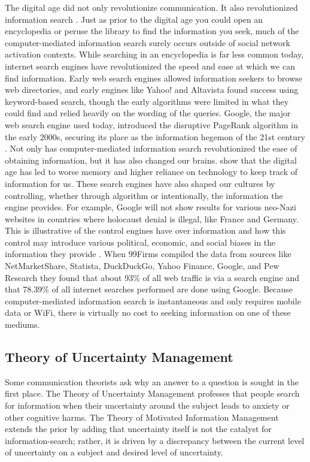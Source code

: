 The digital age did not only revolutionize communication. It also revolutionized
information search \citep{ramirez2002information}. Just as prior to the digital
age you could open an encyclopedia or peruse the library to find the information
you seek, much of the computer-mediated information search surely occurs outside
of social network activation contexts. While searching in an encyclopedia is far
less common today, internet search engines have revolutionized the speed and
ease at which we can find information. Early web search engines allowed
information seekers to browse web directories, and early engines like Yahoo! and
Altavista found success using keyword-based search, though the early algorithms
were limited in what they could find and relied heavily on the wording of the
queries. Google, the major web search engine used today, introduced the
disruptive PageRank algorithm in the early 2000s, securing its place as the
information hegemon of the 21st century \citep{brin1998anatomy}. Not only has
computer-mediated information search revolutionized the ease of obtaining
information, but it has also changed our brains. \citet{sparrow2011google} show
that the digital age has led to worse memory and higher reliance on technology
to keep track of information for us. These search engines have also shaped our
cultures by controlling, whether through algorithm or intentionally, the
information the engine provides. For example, Google will not show results for
various neo-Nazi websites in countries where holocaust denial is illegal, like
France and Germany. This is illustrative of the control engines have over
information and how this control may introduce various political, economic, and
social biases in the information they provide \citep{segev2010google}. When
99Firms \citeyearpar{99firms22} compiled the data from sources like
NetMarketShare, Statista, DuckDuckGo, Yahoo Finance, Google, and Pew Research
they found that about 93\% of all web traffic is via a search engine and that
78.39\% of all internet searches performed are done using Google. Because
computer-mediated information search is instantaneous and only requires mobile
data or WiFi, there is virtually no cost to seeking information on one of these
mediums.

\subsection{Theory of Uncertainty Management}

Some communication theorists ask why an answer to a question is sought in the
first place. The Theory of Uncertainty Management
\citep{brashersCommunicationUncertaintyManagement2001} professes that people
search for information when their uncertainty around the subject leads to
anxiety or other cognitive harms. The Theory of Motivated Information Management
\citep{afifiSeekingInformationSexual2006, afifiTheoryMotivatedInformation2004}
extends the prior by adding that uncertainty itself is not the catalyst for
information-search; rather, it is driven by a discrepancy between the current
level of uncertainty on a subject and desired level of uncertainty. 


